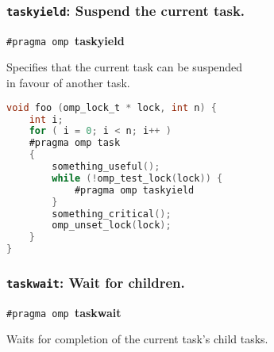 \begin{frame}[fragile]
  \frametitle{{\tt taskyield}: Suspend the current task.}

\begin{changemargin}{1.5cm}  
  \begin{center}
    {\tt \#pragma omp }{\bf taskyield}
  \end{center}
\large
    Specifies that the current task can be suspended \\
\hspace*{2em} in favour of another task.\\[1em]

  \begin{lstlisting}[language=C,morekeywords={foreach,pragma,omp,parallel,single,nowait,task,untied,barrier,taskyield,mergeable,final,taskwait,critical}]
void foo (omp_lock_t * lock, int n) {
    int i;
    for ( i = 0; i < n; i++ )
    #pragma omp task
    {
        something_useful();
        while (!omp_test_lock(lock)) {
            #pragma omp taskyield
        }
        something_critical();
        omp_unset_lock(lock);
    }
}
  \end{lstlisting}
\end{changemargin}
\end{frame}

\begin{frame}[fragile]
  \frametitle{{\tt taskwait}: Wait for children.}

\begin{changemargin}{1cm}  
\large
  \begin{center}
    {\tt \#pragma omp }{\bf taskwait}
  \end{center}

     Waits for completion of the current task's child tasks.
\end{changemargin}

\end{frame}

